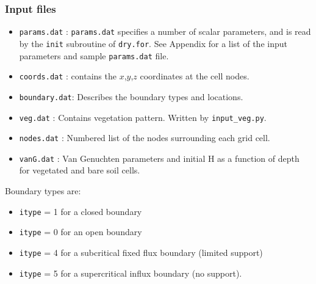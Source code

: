 \documentclass{article}
\newcommand{\code}[1]{\texttt{#1}}
\begin{document}
\subsubsection*{Input files}
\begin{itemize}

	\item \code{params.dat} : \code{params.dat} specifies a number of scalar parameters, and is read by the \code{init} subroutine of \code{dry.for}.  See Appendix for a list of the input parameters and sample \code{params.dat} file.

	\item \code{coords.dat} : contains the $x$,$y$,$z$ coordinates at the cell nodes.

	\item \code{boundary.dat}: Describes the boundary types and locations.

	\item \code{veg.dat} : Contains vegetation pattern. Written by \code{input\_veg.py}. 

	\item \code{nodes.dat} : Numbered list of the nodes surrounding each grid cell.

	\item \code{vanG.dat} : Van Genuchten parameters and initial H as a function of depth for vegetated and bare soil cells. 

\end{itemize}

% 
% 
%  
Boundary types are:
\begin{itemize}
	\item  \code{itype} = 1 for a closed boundary
	\item  \code{itype} = 0 for an open boundary
	\item  \code{itype} = 4 for a subcritical fixed flux boundary  (limited support)
	\item  \code{itype} = 5 for a supercritical influx boundary (no support).
 \end{itemize}
 
\end{document}
